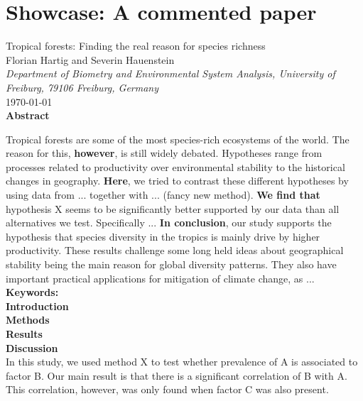\documentclass[justified, notoc]{tufte-book} %
\begin{document}
\section{Showcase: A commented paper}
\begin{center}
	\huge{Tropical forests: Finding the real reason for species richness} \\
	\vspace{0.3em}
	\large{Florian Hartig and Severin Hauenstein}\\
	\vspace{0.3em}
	\small{\textit{Department of Biometry and Environmental System Analysis, University of Freiburg, 79106 Freiburg, Germany}}\\
	\vspace{1em}
	\large{\today}\\
	\vspace{2em}
	\textbf{Abstract}\\
\end{center}
Tropical forests are some of the most species-rich ecosystems of the world.
The reason for this, \textbf{however}, is still widely debated. Hypotheses range from processes related to productivity over environmental stability to the historical changes in geography.
\textbf{Here}, we tried to contrast these different hypotheses by using data from ... together with ... (fancy new method).
\textbf{We find that} hypothesis X seems to be significantly better supported by our data
than all alternatives we test. Specifically ... 
\textbf{In conclusion}, our study supports the hypothesis that species diversity in the
tropics is mainly drive by higher productivity. These results challenge some long held
ideas about geographical stability being the main reason for global diversity
patterns. They also have important practical applications for mitigation of climate
change, as ...\\
\noindent\textbf{Keywords:}  \\

\noindent\Large{\textbf{Introduction}}\\

\noindent\Large{\textbf{Methods}}\\

\noindent\Large{\textbf{Results}}\\

\noindent\Large{\textbf{Discussion}}\\
In this study, we used method X to test whether prevalence of A
is associated to factor B. Our main result is that there is a
significant correlation of B with A. This correlation, however, was
only found when factor C was also present.
\end{document}
